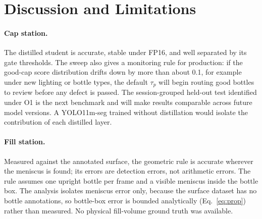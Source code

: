 \section{Discussion and Limitations}
\label{sec:discussion}

\paragraph{Cap station.} The distilled student is accurate, stable under FP16, and well separated by its gate thresholds. The sweep also gives a monitoring rule for production: if the good-cap score distribution drifts down by more than about 0.1, for example under new lighting or bottle types, the default $\tau_p$ will begin routing good bottles to review before any defect is passed. The session-grouped held-out test identified under O1 is the next benchmark and will make results comparable across future model versions. A YOLO11m-seg trained without distillation would isolate the contribution of each distilled layer.

\paragraph{Fill station.} Measured against the annotated surface, the geometric rule is accurate wherever the meniscus is found; its errors are detection errors, not arithmetic errors. The rule assumes one upright bottle per frame and a visible meniscus inside the bottle box. The analysis isolates meniscus error only, because the surface dataset has no bottle annotations, so bottle-box error is bounded analytically (Eq.~\eqref{eq:prop}) rather than measured. No physical fill-volume ground truth was available.

